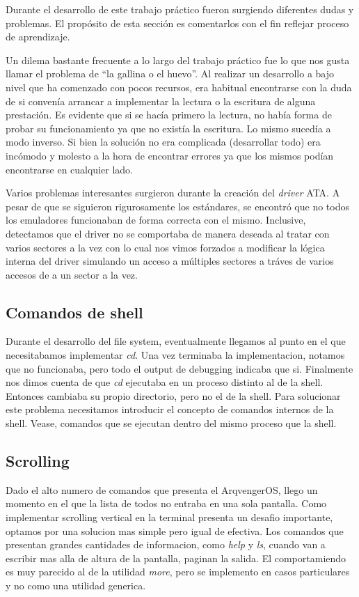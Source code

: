 \documentclass[a4paper,10pt]{article}
\begin{document}
Durante el desarrollo de este trabajo práctico fueron surgiendo diferentes dudas y problemas. El propósito de esta
sección es comentarlos con el fin reflejar proceso de aprendizaje.

Un dilema bastante frecuente a lo largo del trabajo práctico fue lo que nos gusta llamar el problema de ``la gallina o el huevo''. Al realizar
un desarrollo a bajo nivel que ha comenzado con pocos recursos, era habitual encontrarse con la duda de si convenía
arrancar a implementar la lectura o la escritura de alguna prestación. Es evidente que si se hacía primero la lectura, 
no había forma de probar su funcionamiento ya que no existía la escritura. Lo mismo sucedía a modo inverso. Si bien 
la solución no era complicada (desarrollar todo) era incómodo y molesto a la hora de encontrar errores ya que los mismos
podían encontrarse en cualquier lado.

Varios problemas interesantes surgieron durante la creación del \textit{driver} ATA. A pesar de que se siguieron
rigurosamente los estándares, se encontró que no todos los emuladores funcionaban de forma correcta con el mismo.
Inclusive, detectamos que el driver no se comportaba de manera deseada al tratar con varios sectores a la vez con lo
cual nos vimos forzados a modificar la lógica interna del driver simulando un acceso a múltiples sectores a tráves de
varios accesos de a un sector a la vez.


\subsection{Comandos de shell}
Durante el desarrollo del file system, eventualmente llegamos al punto en el que necesitabamos implementar \textit{cd}.
Una vez terminaba la implementacion, notamos que no funcionaba, pero todo el output de debugging indicaba que si.
Finalmente nos dimos cuenta de que \textit{cd} ejecutaba en un proceso distinto al de la shell.
Entonces cambiaba su propio directorio, pero no el de la shell.
Para solucionar este problema necesitamos introducir el concepto de comandos internos de la shell.
Vease, comandos que se ejecutan dentro del mismo proceso que la shell.

\subsection{Scrolling}
Dado el alto numero de comandos que presenta el ArqvengerOS, llego un momento en el que la lista de todos no entraba en una sola pantalla.
Como implementar scrolling vertical en la terminal presenta un desafio importante, optamos por una solucion mas simple pero igual de efectiva.
Los comandos que presentan grandes cantidades de informacion, como \textit{help} y \textit{ls}, cuando van a escribir mas alla de altura de la pantalla, paginan la salida.
El comportamiendo es muy parecido al de la utilidad \textit{more}, pero se implemento en casos particulares y no como una utilidad generica.
\end{document}

